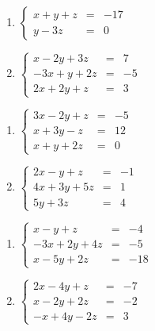 \begin{multicols}{2}
\begin{enumerate}
\setcounter{enumi}{\value{HW}}

\item $\left\{ \begin{array}{rcr} x + y + z & = & -17  \\ y - 3z & = & 0  \end{array} \right.$


\item $\left\{ \begin{array}{rcr} x-2y+3z & = & 7 \\ -3x+y+2z & = & -5 \\ 2x+2y+z & = & 3  \end{array} \right.$


\setcounter{HW}{\value{enumi}}
\end{enumerate}
\end{multicols}



\begin{multicols}{2}
\begin{enumerate}
\setcounter{enumi}{\value{HW}}


\item $\left\{ \begin{array}{rcr} 3x-2y+z & = & -5 \\ x+3y-z & = & 12 \\ x+y+2z & = & 0  \end{array} \right.$
\item $\left\{ \begin{array}{rcr} 2x-y+z& = & -1 \\ 4x+3y+5z & = & 1 \\  5y+3z & = & 4 \end{array} \right.$


\setcounter{HW}{\value{enumi}}
\end{enumerate}
\end{multicols}



\begin{multicols}{2}
\begin{enumerate}
\setcounter{enumi}{\value{HW}}


\item $\left\{ \begin{array}{rcr} x-y+z & = & -4 \\ -3x+2y+4z & = & -5 \\ x-5y+2z & = & -18  \end{array} \right.$
\item $\left\{ \begin{array}{rcr} 2x-4y+z & = & -7 \\ x-2y+2z & = & -2 \\ -x+4y-2z & = & 3  \end{array} \right.$


\setcounter{HW}{\value{enumi}}
\end{enumerate}
\end{multicols}



